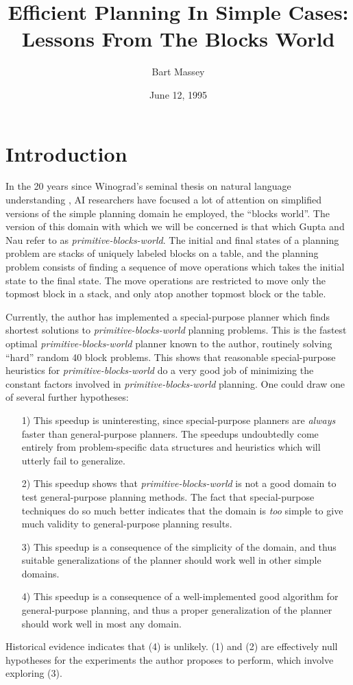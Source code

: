 \documentclass{article}
\title{Efficient Planning In Simple Cases:\\
Lessons From The Blocks World}
\author{Bart Massey}
\date{June 12, 1995}
\newcommand{\sbw}{{\em primitive-blocks-world}}
\begin{document}
\maketitle

\section{Introduction}
\label{section-introduction}

In the 20 years since Winograd's seminal thesis on natural language
understanding \cite{winograd-phd,winograd-book},
AI researchers have focused a lot of attention on simplified
versions of the simple planning domain he employed, the
``blocks world''.  The version of this domain with which
we will be concerned is that which
Gupta and Nau \cite{gupta-nau} refer to as \sbw{}.
The initial and final states of a planning
problem are stacks of uniquely labeled blocks on a table, and the planning
problem consists of finding a sequence of move operations which
takes the initial state to the final state.  The move
operations are restricted to move only the topmost block in a
stack, and only atop another topmost block or the table.

Currently, the author has implemented a special-purpose planner
which finds shortest solutions to \sbw{} planning problems.  This
is the fastest optimal \sbw{} planner known to the author, routinely
solving ``hard'' random 40 block problems.  This shows that
reasonable special-purpose heuristics for \sbw{} do a very good job of
minimizing the constant factors involved in \sbw{} planning.
One could draw one of several further hypotheses:
\begin{enumerate}
\item[1)]
This speedup is uninteresting, since special-purpose planners
are {\em always} faster than general-purpose planners.  The speedups
undoubtedly come entirely from problem-specific data structures and
heuristics which will utterly fail to generalize.
\item[2)]
This speedup shows that \sbw{} is not a good domain to test
general-purpose planning methods.  The fact that special-purpose
techniques do so much better indicates that the domain is {\em too}
simple to give much validity to general-purpose planning results.
\item[3)]
This speedup is a consequence of the simplicity of the domain,
and thus suitable generalizations of the planner should work well
in other simple domains.
\item[4)]
This speedup is a consequence of a well-implemented good algorithm for
general-purpose planning, and thus a proper generalization of
the planner should work well in most any domain.
\end{enumerate}
Historical evidence indicates that (4) is unlikely.
(1) and (2)
are effectively null hypotheses
for the experiments the author proposes to perform, which involve
exploring (3).
\end{document}

